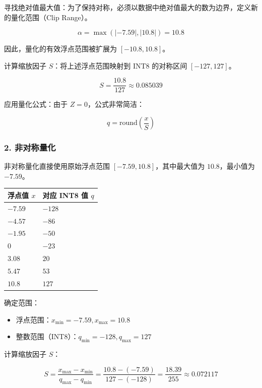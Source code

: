 寻找绝对值最大值：为了保持对称，必须以数据中绝对值最大的数为边界，定义新的量化范围（Clip Range）。

\[
\alpha = \max(|-7.59|, |10.8|) = 10.8
\]

因此，量化的有效浮点范围被扩展为 \([-10.8, 10.8]\)。

计算缩放因子 \(S\)：将上述浮点范围映射到 INT8 的对称区间 \([-127, 127]\)。

\[
S = \frac{10.8}{127} \approx 0.085039
\]

应用量化公式：由于 \(Z = 0\)，公式非常简洁：

\[
q = \mathrm{round}\left(\frac{x}{S}\right)
\]

\hypertarget{ux975eux5bf9ux79f0ux91cfux5316}{%
\subsubsection{2. 非对称量化}\label{ux975eux5bf9ux79f0ux91cfux5316}}

非对称量化直接使用原始浮点范围 \([-7.59, 10.8]\)，其中最大值为 \(10.8\)，最小值为 \(-7.59\)。

\begin{longtable}[]{@{}
  >{\raggedleft\arraybackslash}p{}
  >{\raggedleft\arraybackslash}p{}@{}}
\toprule
浮点值 \(x\) & 对应 INT8 值 \(q\) \\
\midrule
\endhead
\(-7.59\) & \(-128\) \\
\(-4.57\) & \(-86\) \\
\(-1.95\) & \(-50\) \\
\(0\) & \(-23\) \\
\(3.08\) & \(20\) \\
\(5.47\) & \(53\) \\
\(10.8\) & \(127\) \\
\bottomrule
\end{longtable}

确定范围：

\begin{itemize}
\tightlist
\item
  浮点范围：\(x_{\min} = -7.59, x_{\max} = 10.8\)
\item
  整数范围（INT8）：\(q_{\min} = -128, q_{\max} = 127\)
\end{itemize}

计算缩放因子 \(S\)：

\[
S = \frac{x_{\max} - x_{\min}}{q_{\max} - q_{\min}}
  = \frac{10.8 - (-7.59)}{127 - (-128)}
  = \frac{18.39}{255}
  \approx 0.072117
\]

